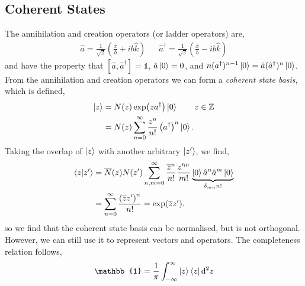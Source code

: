 \documentclass{book}
\renewcommand{\braket}[2]{\langle#1|#2\rangle}
\begin{document}
\subsection{Coherent States}
The annihilation and creation operators (or ladder operators) are,
\begin{align}
	\hat{a} = \frac{1}{\sqrt{2}}\left(\frac{\hat{x}}{b} + ib\hat{k}\right) && \hat{a}^{\dag} = \frac{1}{\sqrt{2}}\left(\frac{\hat{x}}{b} - ib\hat{k}\right)
\end{align}
and have the property that $\left[\hat{a},\hat{a}^{\dag}\right] = \mathbb{1}$, $\hat{a}\ket{0} = 0$, and $n(a^{\dag})^{n-1}\ket{0} = \hat{a}(\hat{a}^{\dag})^n\ket{0}$. From the annihilation and creation operators we can form a \textit{coherent state basis}, which is defined,
\begin{equation}
	\begin{split}
	\ket{z} & = N(z)\exp(za^{\dag})\ket{0} \hspace{2em} z \in \mathbb{Z} \\
	& = N(z) \sum_{n=0}^{\infty}\frac{z^n}{n!}\left(a^{\dag}\right)^n\ket{0}.
	\end{split}
\end{equation}
Taking the overlap of $\ket{z}$ with another arbitrary $\ket{z'}$, we find,
\begin{equation}
	\begin{split}
		\braket{z}{z'} & = \overline{N}(z)N(z')\sum_{n,m=0}^{\infty}\frac{\overline{z}^n}{n!}\frac{z'^m}{m!}\underbrace{\ket{0}\hat{a}^n\hat{a}^m\ket{0}}_{\delta_{mn}n!} \\
		 & = \sum_{n=0}^{\infty}\frac{\left(\overline{z}z'\right)^n}{n!} = \exp(\overline{z}z').
	\end{split}
\end{equation}
so we find that the coherent state basis can be normalised, but is not orthogonal. However, we can still use it to represent vectors and operators. The completeness relation follows,
\begin{equation}
	\mathbb{1} = \frac{1}{\pi}\int_{-\infty}^{\infty}\ket{z}\bra{z}\dd^2z
\end{equation}
\end{document}
